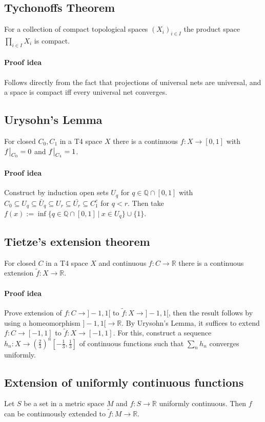 \documentclass{scrartcl}
\newcommand{\R}{\mathbb{R}}
\newcommand{\Q}{\mathbb{Q}}
\newcommand\restr[2]{{
    \left.\kern-\nulldelimiterspace
    #1
    \vphantom{\big|}
    \right|_{#2}
}}
\begin{document}
\subsection{Tychonoffs Theorem}
For a collection of compact topological spaces $(X_i)_{i \in I}$ the product space $\prod_{i \in I} X_i$ is compact.
\paragraph{Proof idea} Follows directly from the fact that projections of universal nets are universal, and a space is compact iff every universal net converges.

\subsection{Urysohn's Lemma}
For closed $C_0, C_1$ in a T4 space $X$ there is a continuous $f: X \to [0, 1]$ with $\restr{f}{C_0} = 0$ and $\restr{f}{C_1} = 1$.
\paragraph{Proof idea} Construct by induction open sets $U_q$ for $q \in \Q \cap [0, 1]$ with $C_0 \subseteq U_q \subseteq \bar{U}_q \subseteq U_r \subseteq \bar{U_r} \subseteq C_1^c$ for $q < r$. Then take $f(x) := \inf \{q \in \Q \cap [0, 1] \ | \ x \in U_q \} \cup \{1\}$.

\subsection{Tietze's extension theorem}
For closed $C$ in a T4 space $X$ and continuous $f: C \to \R$ there is a continuous extension $\tilde{f}: X \to \R$.
\paragraph{Proof idea} Prove extension of $f: C \to ]-1,1[$ to $\tilde{f}: X \to ]-1,1[$, then the result follows by using a homeomorphism $]-1,1[ \to \R$.
By Urysohn's Lemma, it suffices to extend $f: C \to [-1, 1]$ to $\tilde{f}: X \to [-1, 1]$. For this, construct a sequence $h_n: X \to (\frac 2 3)^n [-\frac 1 3, \frac 1 3]$ of continuous functions such that $\sum_n h_n$ converges uniformly.

\subsection{Extension of uniformly continuous functions}
Let $S$ be a set in a metric space $M$ and $f: S \to \R$ uniformly continuous. Then $f$ can be continuously extended to $\tilde{f}: M \to \R$.
\end{document}
